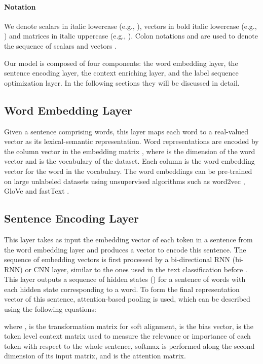\documentclass[11pt,a4paper]{article}
\begin{document}
\paragraph{Notation} We denote scalars in italic lowercase (e.g., ), vectors in bold italic lowercase (e.g., ) and matrices in italic uppercase (e.g., ). Colon notations  and  are used to denote the sequence of scalars  and vectors .


Our model is composed of four components: the word embedding layer, the sentence encoding layer, the context enriching layer, and the label sequence optimization layer. In the following sections they will be discussed in detail.

\subsection{Word Embedding Layer}

Given a sentence  comprising  words, this layer maps each word to a real-valued vector as its lexical-semantic representation. Word representations are encoded by the column vector in the embedding matrix , where  is the dimension of the word vector and  is the vocabulary of the dataset. Each column  is the word embedding vector for the  word in the vocabulary.  The word embeddings  can be pre-trained on large unlabeled datasets using unsupervised algorithms such as word2vec \cite{mikolov2013distributed}, GloVe \cite{pennington2014glove} and fastText \cite{bojanowski2016enriching}.


\subsection{Sentence Encoding Layer}

This layer takes as input the embedding vector of each token in a sentence from the word embedding layer and produces a vector  to encode this sentence. The sequence of embedding vectors is first processed by a bi-directional RNN (bi-RNN) or CNN layer, similar to the ones used in the text classification before \cite{kim2014convolutional,lee2016sequential,liu2016recurrent}. This layer outputs a sequence of hidden states  () for a sentence of  words with each hidden state corresponding to a word. To form the final representation vector  of this sentence, attention-based pooling is used, which can be described using the following equations:




where ,  is the transformation matrix for soft alignment,  is the bias vector,  is the token level context matrix used to measure the relevance or importance of each token with respect to the whole sentence, softmax is performed along the second dimension of its input matrix, and  is the attention matrix.
\end{document}
